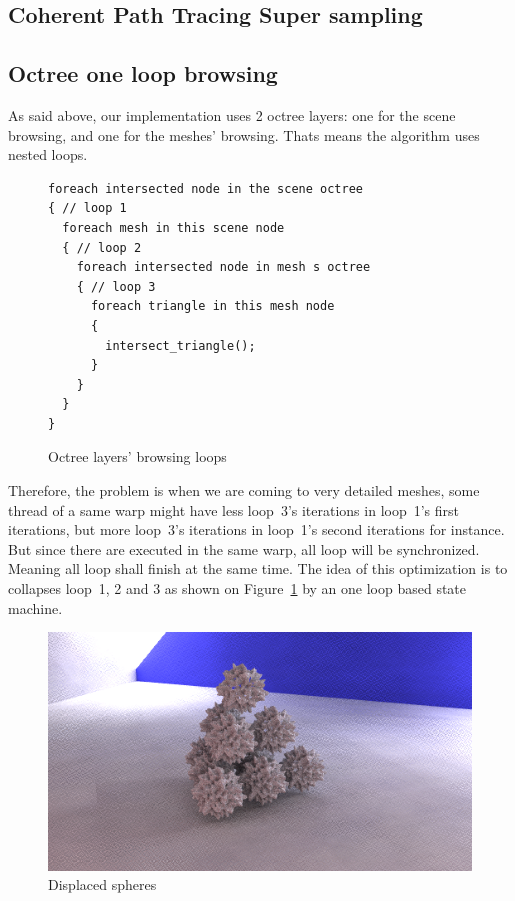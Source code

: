 \documentclass[10pt,twocolumn,a4paper]{article}
\begin{document}
\subsection{Coherent Path Tracing Super sampling}
\subsection{Octree one loop browsing}
As said above, our implementation uses 2 octree layers: one for the scene browsing,
and one for the meshes' browsing. Thats means the algorithm uses nested loops.
\begin{figure}[H]
    \centering
    \begin{lstlisting}[morekeywords={foreach}]
foreach intersected node in the scene octree
{ // loop 1
  foreach mesh in this scene node
  { // loop 2
    foreach intersected node in mesh s octree
    { // loop 3
      foreach triangle in this mesh node
      {
        intersect_triangle();
      }
    }
  }
}
    \end{lstlisting}
    \caption{Octree layers' browsing loops}
    \label{code:octree_layers_loops}
\end{figure}

Therefore, the problem is when we are coming to very detailed meshes, some thread
of a same warp might have less loop~3's iterations in loop~1's first iterations,
but more loop~3's iterations in loop~1's second iterations for instance. But since
there are executed in the same warp, all loop will be synchronized. Meaning all
loop shall finish at the same time. The idea of this optimization
is to collapses loop~1, 2 and 3 as shown on Figure~\ref{code:octree_layers_loops}
by an one loop based state machine.

\begin{figure}[h]
    \centering
    \includegraphics[width=0.8\columnwidth]{render_displaced_spheres.png}
    \caption{Displaced spheres}
    \label{fig:displaced_spheres}
\end{figure}
\end{document}
